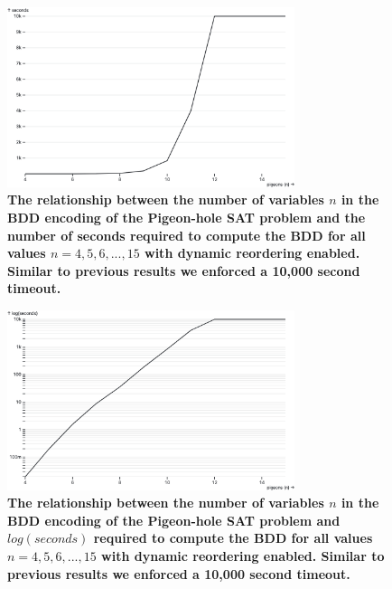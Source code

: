 \documentclass{article}
\begin{document}
\begin{figure}[ht]
  \centering
  \includegraphics[width=0.75\textwidth]{bdd-reorder}
  \caption{\textbf{The relationship between the number of variables $n$ in the BDD encoding of the Pigeon-hole SAT problem and the number of seconds required to compute the BDD for all values $n = 4, 5, 6,...,15$ with dynamic reordering enabled. Similar to previous results we enforced a 10,000 second timeout.}}
  \label{fig:bdd-reorder}
\end{figure}

\begin{figure}[ht]
  \centering
  \includegraphics[width=0.75\textwidth]{bdd-reorder-log}
  \caption{\textbf{The relationship between the number of variables $n$ in the BDD encoding of the Pigeon-hole SAT problem and $log(seconds)$ required to compute the BDD for all values $n = 4, 5, 6,...,15$ with dynamic reordering enabled. Similar to previous results we enforced a 10,000 second timeout.}}
  \label{fig:bdd-reorder-log}
\end{figure}



\end{document}
